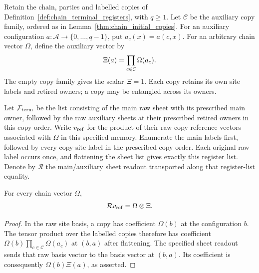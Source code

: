 \begin{definition}
    \label{def:chain_terminal_reference}
    \leanok
    Retain the chain, parties and labelled copies of
    Definition~\ref{def:chain_terminal_registers}, with $q\ge1$.
    Let $\mathcal C$ be the auxiliary copy family, ordered as in
    Lemma~\ref{thm:chain_initial_copies}. For an auxiliary configuration
    $a:\mathcal A\to\{0,\ldots,q-1\}$, put $a_c(x)=a(c,x)$.
    For an arbitrary chain vector $\Omega$, define the auxiliary vector by
    \begin{align}
        \Xi(a)=\prod_{c\in\mathcal C}\Omega(a_c).\notag
    \end{align}
    The empty copy family gives the scalar $\Xi=1$.
    Each copy retains its own site labels and retired owners; a copy
    may be entangled across its owners.

    Let $\mathcal F_{\rm term}$ be the list consisting of the main raw
    sheet with its prescribed main owner, followed by the raw auxiliary
    sheets at their prescribed retired owners in this copy order.
    Write $v_{\rm ref}$ for the product of their raw copy reference
    vectors associated with $\Omega$ in this specified memory. Enumerate the
    main labels first, followed
    by every copy-site label in the prescribed copy order. Each original
    raw label occurs once, and flattening the sheet list gives exactly
    this register list. Denote by $\mathcal R$ the main/auxiliary
    sheet readout transported along that register-list equality.
\end{definition}

\begin{lemma}
    \label{thm:chain_terminal_reference_coordinates}
    \leanok
    For every chain vector $\Omega$,
    \begin{align}
        \mathcal R v_{\rm ref}=\Omega\otimes\Xi.\notag
    \end{align}
\end{lemma}
\begin{proof}\leanok
    In the raw site basis, a copy has coefficient $\Omega(b)$ at the
    configuration $b$. The tensor product over the labelled copies
    therefore has coefficient $\Omega(b)\prod_{c\in\mathcal C}\Omega(a_c)$
    at $(b,a)$ after flattening. The specified sheet readout sends that
    raw basis vector to the basis vector at $(b,a)$. Its coefficient
    is consequently $\Omega(b)\Xi(a)$, as asserted.
\end{proof}

